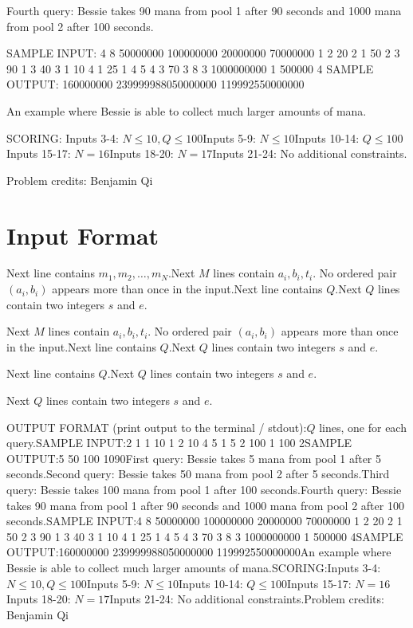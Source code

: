 \documentclass[12pt]{article}
\begin{document}
Fourth query: Bessie takes 90 mana from pool 1 after 90 seconds and 1000 mana
from pool 2 after 100 seconds.

SAMPLE INPUT:
4 8
50000000 100000000 20000000 70000000
1 2 20
2 1 50
2 3 90
1 3 40
3 1 10
4 1 25
1 4 5
4 3 70
3
8 3
1000000000 1
500000 4
SAMPLE OUTPUT: 
160000000
239999988050000000
119992550000000

An example where Bessie is able to collect much larger amounts of mana.

SCORING:
Inputs 3-4: $N\le 10, Q\le 100$Inputs 5-9: $N\le 10$Inputs 10-14: $Q\le 100$Inputs 15-17: $N = 16$Inputs 18-20: $N = 17$Inputs 21-24: No additional constraints.


Problem credits: Benjamin Qi



\section*{Input Format}
Next line contains $m_1,m_2,\dots, m_N$.Next $M$ lines contain $a_i,b_i,t_i$. No ordered pair $(a_i,b_i)$ appears more
than once in the input.Next line contains $Q$.Next $Q$ lines contain two integers $s$ and $e$.

Next $M$ lines contain $a_i,b_i,t_i$. No ordered pair $(a_i,b_i)$ appears more
than once in the input.Next line contains $Q$.Next $Q$ lines contain two integers $s$ and $e$.

Next line contains $Q$.Next $Q$ lines contain two integers $s$ and $e$.

Next $Q$ lines contain two integers $s$ and $e$.

OUTPUT FORMAT (print output to the terminal / stdout):$Q$ lines, one for each query.SAMPLE INPUT:2 1
1 10
1 2 10
4
5 1
5 2
100 1
100 2SAMPLE OUTPUT:5
50
100
1090First query: Bessie takes 5 mana from pool 1 after 5 seconds.Second query: Bessie takes 50 mana from pool 2 after 5 seconds.Third query: Bessie takes 100 mana from pool 1 after 100 seconds.Fourth query: Bessie takes 90 mana from pool 1 after 90 seconds and 1000 mana
from pool 2 after 100 seconds.SAMPLE INPUT:4 8
50000000 100000000 20000000 70000000
1 2 20
2 1 50
2 3 90
1 3 40
3 1 10
4 1 25
1 4 5
4 3 70
3
8 3
1000000000 1
500000 4SAMPLE OUTPUT:160000000
239999988050000000
119992550000000An example where Bessie is able to collect much larger amounts of mana.SCORING:Inputs 3-4: $N\le 10, Q\le 100$Inputs 5-9: $N\le 10$Inputs 10-14: $Q\le 100$Inputs 15-17: $N = 16$Inputs 18-20: $N = 17$Inputs 21-24: No additional constraints.Problem credits: Benjamin Qi
\end{document}
